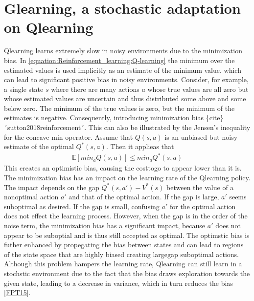 \documentclass[letterpaper,10pt,english]{jupyterBook}
\begin{document}
\section{G\sphinxhyphen{}learning, a stochastic adaptation on Q\sphinxhyphen{}learning}
\label{\detokenize{Reinforcement_learning:g-learning-a-stochastic-adaptation-on-q-learning}}
\sphinxAtStartPar
Q\sphinxhyphen{}learning learns extremely slow in noisy environments due to the minimization bias. In \eqref{equation:Reinforcement_learning:Q-learning} the minimum over the estimated values is used implicitly as an estimate of the minimum value, which can lead to significant positive bias in noisy environments. Consider, for example, a single state \(s\) where there are many actions \(a\) whose true values are all zero but whose estimated values are uncertain and thus distributed some above and some below zero. The minimum of the true values is zero, but the minimum of the estimates is negative. Consequently, introducing minimization bias \{cite\}´sutton2018reinforcement´. This can also be illustrated by the Jensen’s inequality for the concave min operator. Assume that \(Q(s,a)\) is an unbiased but noisy estimate of the optimal \(Q^*(s,a)\). Then it applieas that
\begin{equation*}
\begin{split} \mathbb{E}[min_aQ(s,a)] \leq min_aQ^*(s,a)\end{split}
\end{equation*}
\sphinxAtStartPar
This creates an optimistic bias, causing the cost\sphinxhyphen{}to\sphinxhyphen{}go to appear lower than it is. The minimization bias has an impact on the learning rate of the Q\sphinxhyphen{}learning policy. The impact depends on the gap \(Q^*(s,a') - V^*(s)\)  between the value of a non\sphinxhyphen{}optimal action \(a'\) and that of the optimal action. If the gap is large, \(a'\) seems suboptimal as desired. If the gap is small, confusing \(a'\) for the optimal action does not effect the learning process. However, when the gap is in the order of the noise term, the minimization bias has a significant impact, because \(a'\) does not appear to be suboptial and is thus still accepted as optimal. The optimstic bias is futher enhanced by propegating the bias between states and can lead to regions of the state space that are highly biased creating large\sphinxhyphen{}gap suboptimal actions. Although this problem hampers the learning rate, Q\sphinxhyphen{}learning can still learn in a stochstic environment due to the fact that the bias draws exploration towards the given state, leading to a decrease in variance, which in turn reduces the bias {[}\hyperlink{cite.Discussion:id43}{FPT15}{]}.
\end{document}
